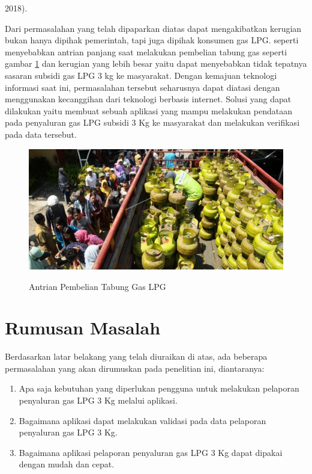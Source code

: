2018).
\newpage
\par Dari permasalahan yang telah dipaparkan diatas dapat mengakibatkan kerugian bukan hanya dipihak pemerintah, tapi juga dipihak konsumen gas LPG. seperti menyebabkan antrian panjang saat melakukan pembelian tabung gas seperti gambar \ref{antrian} dan kerugian yang lebih besar yaitu dapat menyebabkan tidak tepatnya sasaran subsidi gas LPG 3 kg ke masyarakat. Dengan kemajuan teknologi informasi saat ini, permasalahan tersebut seharusnya dapat diatasi dengan menggunakan kecanggihan dari teknologi berbasis internet. Solusi yang dapat dilakukan yaitu membuat sebuah aplikasi yang mampu melakukan pendataan pada penyaluran gas LPG subsidi 3 Kg ke masyarakat dan melakukan verifikasi pada data tersebut.
\begin{figure}[H]
	\centering
	\includegraphics [width = 15cm]{gambar/antrian}
	\caption{Antrian Pembelian Tabung Gas LPG }
	\citep{antaraRiau}
	\label{antrian}
\end{figure}

\section{Rumusan Masalah}
Berdasarkan latar belakang yang telah diuraikan di atas, ada beberapa permasalahan yang akan dirumuskan pada penelitian ini, diantaranya:
\begin{enumerate}
	\item Apa saja kebutuhan yang diperlukan pengguna untuk melakukan pelaporan penyaluran gas LPG 3 Kg melalui aplikasi.
	\item Bagaimana aplikasi dapat melakukan validasi pada data pelaporan penyaluran gas LPG 3 Kg.
	\item Bagaimana aplikasi pelaporan penyaluran gas LPG 3 Kg dapat dipakai dengan mudah dan cepat.
\end{enumerate}

\newpage
